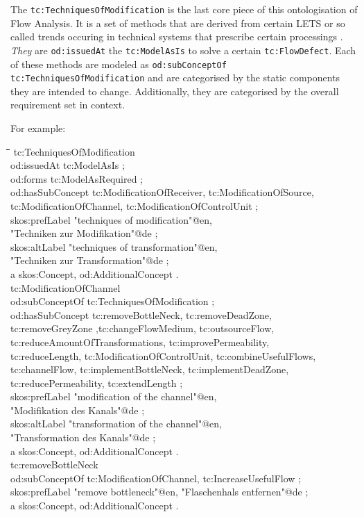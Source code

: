\documentclass[a4paper,11pt]{article}
\newenvironment{code}{\tt \begin{tabbing}
\hskip12pt\=\hskip12pt\=\hskip12pt\=\hskip12pt\=\hskip5cm\=\hskip5cm\=\kill}
{\end{tabbing}}
\begin{document}
The \texttt{tc:TechniquesOfModification} is the last core piece of this
ontologisation of Flow Analysis. It is a set of methods that are derived from
certain LETS or so called trends occuring in technical systems that prescribe
certain processings \cite{KoltzeSouchkov2017}. \emph{They} are
\texttt{od:issuedAt} the \texttt{tc:ModelAsIs} to solve a certain
\texttt{tc:FlowDefect}.  Each of these methods are modeled as
\texttt{od:subConceptOf tc:TechniquesOfModification} and are categorised by
the static components they are intended to change. Additionally, they are
categorised by the overall requirement set in context.

For example:
\begin{code}
tc:TechniquesOfModification \\
\> od:issuedAt tc:ModelAsIs ; \\
\> od:forms tc:ModelAsRequired ; \\
\> od:hasSubConcept tc:ModificationOfReceiver, tc:ModificationOfSource, \\
\>\> tc:ModificationOfChannel, tc:ModificationOfControlUnit ; \\
\> skos:prefLabel "techniques of modification"@en,\\
\>\> "Techniken zur Modifikation"@de ; \\
\> skos:altLabel "techniques of transformation"@en,\\
\>\> "Techniken zur Transformation"@de ; \\
\> a skos:Concept, od:AdditionalConcept . \\[6pt]

tc:ModificationOfChannel \\
\> od:subConceptOf tc:TechniquesOfModification ; \\
\> od:hasSubConcept tc:removeBottleNeck, tc:removeDeadZone,  \+\\
\> tc:removeGreyZone ,tc:changeFlowMedium, tc:outsourceFlow,  \\
\> tc:reduceAmountOfTransformations, tc:improvePermeability,  \\
\> tc:reduceLength, tc:ModificationOfControlUnit, tc:combineUsefulFlows,  \\
\> tc:channelFlow, tc:implementBottleNeck, tc:implementDeadZone,  \\
\> tc:reducePermeability, tc:extendLength ; \-\\
\> skos:prefLabel "modification of the channel"@en,\\
\>\> "Modifikation des Kanals"@de ; \\
\> skos:altLabel "transformation of the channel"@en,\\
\>\> "Transformation des Kanals"@de ; \\
\> a skos:Concept, od:AdditionalConcept . \\[6pt]

tc:removeBottleNeck \\
\> od:subConceptOf tc:ModificationOfChannel, tc:IncreaseUsefulFlow ; \\
\> skos:prefLabel "remove bottleneck"@en, "Flaschenhals entfernen"@de ; \\
\> a skos:Concept, od:AdditionalConcept . \\
\end{code}
\end{document}
